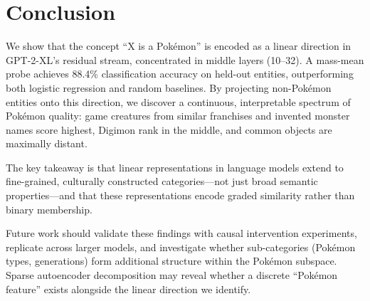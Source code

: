 \section{Conclusion}
\label{sec:conclusion}

We show that the concept ``X is a Pok\'{e}mon'' is encoded as a linear direction in GPT-2-XL's residual stream, concentrated in middle layers (10--32). A mass-mean probe achieves 88.4\% classification accuracy on held-out entities, outperforming both logistic regression and random baselines. By projecting non-Pok\'{e}mon entities onto this direction, we discover a continuous, interpretable spectrum of Pok\'{e}mon quality: game creatures from similar franchises and invented monster names score highest, Digimon rank in the middle, and common objects are maximally distant.

The key takeaway is that linear representations in language models extend to fine-grained, culturally constructed categories---not just broad semantic properties---and that these representations encode graded similarity rather than binary membership.

Future work should validate these findings with causal intervention experiments, replicate across larger models, and investigate whether sub-categories (Pok\'{e}mon types, generations) form additional structure within the Pok\'{e}mon subspace. Sparse autoencoder decomposition may reveal whether a discrete ``Pok\'{e}mon feature'' exists alongside the linear direction we identify.